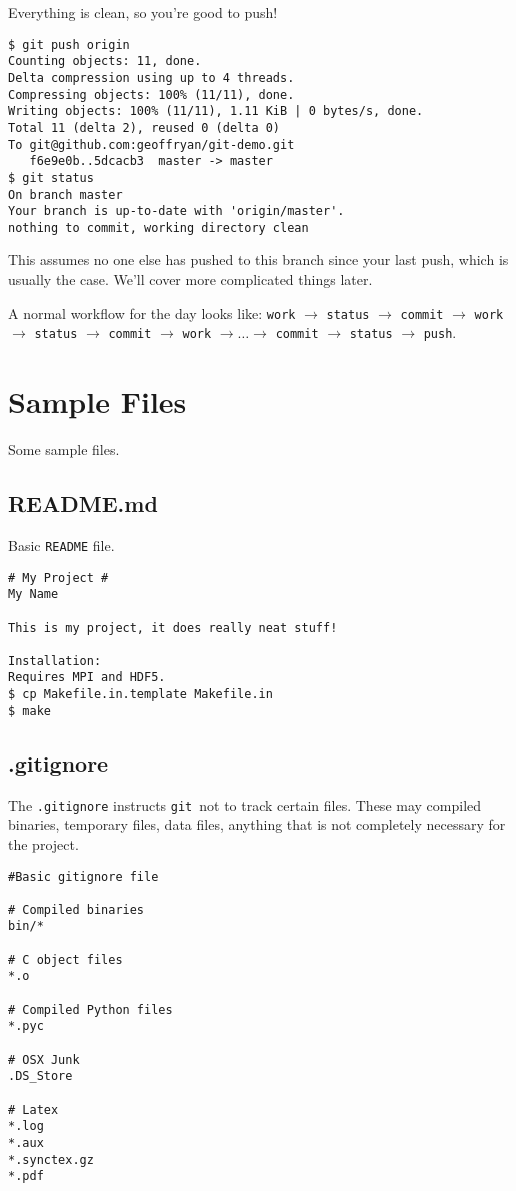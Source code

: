 \documentclass[14pt]{amsart}
\newcommand{\git}{{\texttt{git}}}
\begin{document}
Everything is clean, so you're good to push!

\begin{lstlisting}
$ git push origin
Counting objects: 11, done.
Delta compression using up to 4 threads.
Compressing objects: 100% (11/11), done.
Writing objects: 100% (11/11), 1.11 KiB | 0 bytes/s, done.
Total 11 (delta 2), reused 0 (delta 0)
To git@github.com:geoffryan/git-demo.git
   f6e9e0b..5dcacb3  master -> master
$ git status
On branch master
Your branch is up-to-date with 'origin/master'.
nothing to commit, working directory clean
\end{lstlisting}

This assumes no one else has pushed to this branch since your last push, which is usually the case.  We'll cover more complicated things later.

A normal workflow for the day looks like: \texttt{work} $\rightarrow$ \texttt{status} $\rightarrow$ \texttt{commit} $\rightarrow$ \texttt{work} $\rightarrow$ \texttt{status} $\rightarrow$ \texttt{commit} $\rightarrow$ \texttt{work} $\rightarrow \dots \rightarrow$  \texttt{commit} $\rightarrow$ \texttt{status} $\rightarrow$ \texttt{push}.

\section{Sample Files}

Some sample files.

\subsection{README.md}

Basic \texttt{README} file.

\begin{lstlisting}
# My Project #
My Name

This is my project, it does really neat stuff!

Installation:
Requires MPI and HDF5.
$ cp Makefile.in.template Makefile.in
$ make

\end{lstlisting}

\subsection{.gitignore}

The \texttt{.gitignore} instructs \git\ not to track certain files.  These may compiled binaries, temporary files, data files, anything that is not completely necessary for the project.

\begin{lstlisting}
#Basic gitignore file

# Compiled binaries
bin/*

# C object files
*.o

# Compiled Python files
*.pyc

# OSX Junk
.DS_Store

# Latex
*.log
*.aux
*.synctex.gz
*.pdf
\end{lstlisting}
\end{document}
